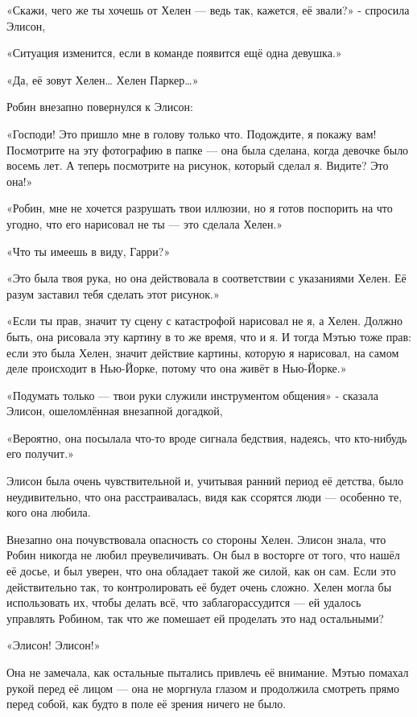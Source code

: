 \documentclass[a4paper,12pt]{book}
\begin{document}
\par
«Скажи, чего же ты хочешь от Хелен — ведь так, кажется, её звали?» - спросила Элисон,
\par
«Ситуация изменится, если в команде появится ещё одна девушка.»
\par
«Да, её зовут Хелен…  Хелен Паркер…»
\par
Робин внезапно повернулся к Элисон:
\par
«Господи! Это пришло мне в голову только что. Подождите, я покажу вам! Посмотрите на эту фотографию в папке — она была сделана, когда девочке было восемь лет. А теперь посмотрите на рисунок, который сделал я. Видите? Это она!»
\par
«Робин, мне не хочется разрушать твои иллюзии, но я готов поспорить на что угодно, что его нарисовал не ты — это сделала Хелен.»
\par
«Что ты имеешь в виду, Гарри?»
\par
«Это была твоя рука, но она действовала в соответствии с указаниями Хелен. Её разум заставил тебя сделать этот рисунок.»
\par
«Если ты прав, значит ту сцену с катастрофой нарисовал не я, а Хелен. Должно быть, она рисовала эту картину в то же время, что и я. И тогда Мэтью тоже прав: если это была Хелен, значит действие картины, которую я нарисовал, на самом деле происходит в Нью-Йорке, потому что она живёт в Нью-Йорке.»
\par
«Подумать только — твои руки служили инструментом общения» - сказала Элисон, ошеломлённая внезапной догадкой,
\par
«Вероятно, она посылала что-то вроде сигнала бедствия, надеясь, что кто-нибудь его получит.»\\
\par
Элисон была очень чувствительной и, учитывая ранний период её детства, было неудивительно, что она расстраивалась, видя как ссорятся люди — особенно те, кого она любила.
\par
Внезапно она почувствовала опасность со стороны Хелен. Элисон знала, что Робин никогда не любил преувеличивать. Он был в восторге от того, что нашёл её досье, и был уверен, что она обладает такой же силой, как он сам. Если это действительно так, то контролировать её будет очень сложно. Хелен могла бы использовать их, чтобы делать всё, что заблагорассудится — ей удалось управлять Робином, так что же помешает ей проделать это над остальными?
\par
«Элисон! Элисон!»
\par
Она не замечала, как остальные пытались привлечь её внимание. Мэтью помахал рукой перед её лицом — она не моргнула глазом и продолжила смотреть прямо перед собой, как будто в поле её зрения ничего не было.
\end{document}
